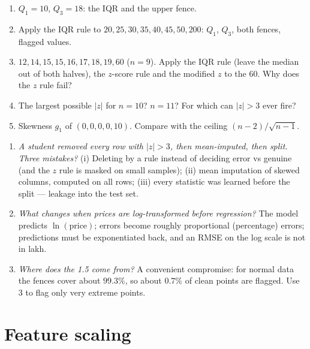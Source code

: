 \documentclass[11pt]{article}
\begin{document}
\begin{tryit}
\begin{enumerate}[label=\textbf{E10.\arabic*}]
  \item $Q_1 = 10$, $Q_3 = 18$: the IQR and the upper fence.
  \item Apply the IQR rule to $20, 25, 30, 35, 40, 45, 50, 200$: $Q_1$, $Q_3$,
    both fences, flagged values.
  \item $12, 14, 15, 15, 16, 17, 18, 19, 60$ ($n = 9$). Apply the IQR rule
    (leave the median out of both halves), the $z$-score rule and the
    modified $z$ to the $60$. Why does the $z$ rule fail?
  \item The largest possible $|z|$ for $n = 10$? $n = 11$? For which can
    $|z| > 3$ ever fire?
  \item Skewness $g_1$ of $(0, 0, 0, 0, 10)$. Compare with the ceiling
    $(n - 2)/\sqrt{n - 1}$.
\end{enumerate}
\end{tryit}

\begin{concept}
\begin{enumerate}[label=\textbf{C10.\arabic*}]
  \item \emph{A student removed every row with $|z| > 3$, then mean-imputed,
    then split. Three mistakes?} (i) Deleting by a rule instead of deciding
    error vs genuine (and the $z$ rule is masked on small samples);
    (ii) mean imputation of skewed columns, computed on all rows; (iii) every
    statistic was learned before the split --- leakage into the test set.
  \item \emph{What changes when prices are log-transformed before
    regression?} The model predicts $\ln(\text{price})$; errors become
    roughly proportional (percentage) errors; predictions must be
    exponentiated back, and an RMSE on the log scale is not in lakh.
  \item \emph{Where does the 1.5 come from?} A convenient compromise: for
    normal data the fences cover about $99.3\%$, so about $0.7\%$ of clean
    points are flagged. Use $3$ to flag only very extreme points.
\end{enumerate}
\end{concept}

\section{Feature scaling}
\label{sec:scaling}
\end{document}
